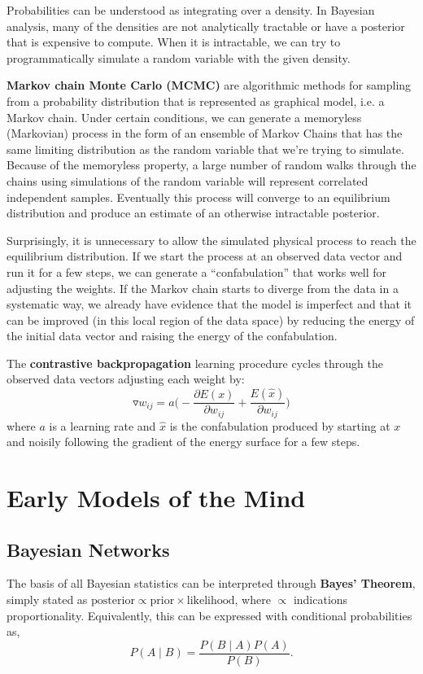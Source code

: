 \documentclass{article}
\begin{document}
Probabilities can be understood as integrating over a density. In Bayesian analysis, many of the densities are not analytically tractable or have a posterior that is expensive to compute. When it is intractable, we can try to programmatically simulate a random variable with the given density. 

\textbf{Markov chain Monte Carlo (MCMC)} are algorithmic methods for sampling from a probability distribution that is represented as graphical model, i.e. a Markov chain. Under certain conditions, we can generate a memoryless (Markovian) process in the form of an ensemble of Markov Chains that has the same limiting distribution as the random variable that we're trying to simulate. Because of the memoryless property, a large number of random walks through the chains using simulations of the random variable will represent correlated independent samples. Eventually this process will converge to an equilibrium distribution and produce an estimate of an otherwise intractable posterior.

Surprisingly, it is unnecessary to allow the simulated physical process to reach the equilibrium distribution. If we start the process at an observed data vector and run it for a few steps, we can generate a ``confabulation” that works well for adjusting the weights. If the Markov chain starts to diverge from the data in a systematic way, we already have evidence that the model is imperfect and that it can be improved (in this local region of the data space) by reducing the energy of the initial data vector and raising the energy of the confabulation. 

The \textbf{contrastive backpropagation} learning procedure cycles through the observed data vectors adjusting each weight by:
\[
    \triangledown w_{ij} = a \bigg (  - \frac{\partial E(x)}{\partial w_{ij}} +  \frac{E(\hat x)}{\partial w_{ij}} \bigg)
\]
where $a$ is a learning rate and $\hat x$ is the confabulation produced by starting at $x$ and noisily following the gradient of the energy surface for a few steps.


\section{Early Models of the Mind}

\subsection{Bayesian Networks}

The basis of all Bayesian statistics can be interpreted through \textbf{Bayes' Theorem}, simply stated as $\text{posterior}\propto \text{prior} \times \text{likelihood}$, where $\propto$ indications proportionality. Equivalently, this can be expressed with conditional probabilities as,
\[
P(A\mid B)={\frac {P(B\mid A)P(A)}{P(B)}}.
\]
\end{document}
